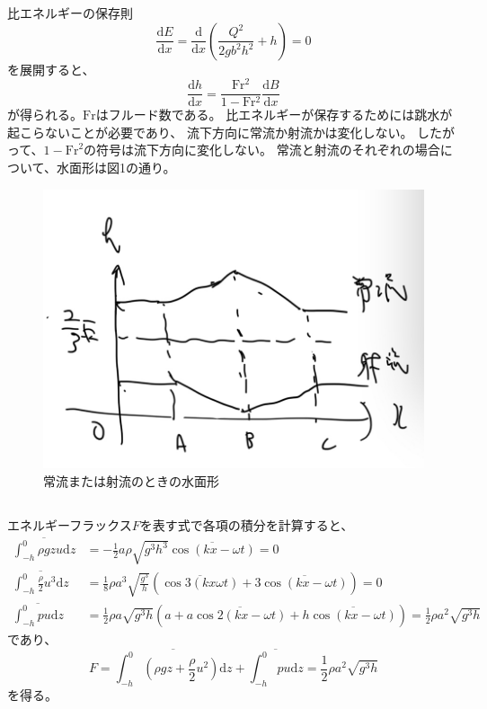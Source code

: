 \documentclass[a4paper]{jsarticle}
\begin{document}
\subsubsection{}
比エネルギーの保存則
\begin{equation}
  \frac{\mathrm{d} E}{\mathrm{d} x}
  = \frac{\mathrm{d}}{\mathrm{d} x}
  \left(\frac{Q^2}{2 g b^2 h^2} + h\right)
  = 0
\end{equation}
を展開すると、
\begin{equation}
  \frac{\mathrm{d} h}{\mathrm{d} x}
  = \frac{\mathrm{Fr^2}}{1 - \mathrm{Fr^2}}
  \frac{\mathrm{d} B}{\mathrm{d} x}
\end{equation}
が得られる。$\mathrm{Fr}$はフルード数である。
比エネルギーが保存するためには跳水が起こらないことが必要であり、
流下方向に常流か射流かは変化しない。
したがって、$1 - \mathrm{Fr}^2$の符号は流下方向に変化しない。
常流と射流のそれぞれの場合について、水面形は図1の通り。
\begin{figure}[htb]
  \centering
  \includegraphics[width=0.5\hsize]{fig1.png}
  \caption{常流または射流のときの水面形}
\end{figure}

\subsection{}
\subsubsection{}
エネルギーフラックス$F$を表す式で各項の積分を計算すると、
\begin{align}
  \overline{\int_{-h}^0 \rho g z u \mathrm{d} z}
  &= -\frac{1}{2} a \rho \sqrt{g^3 h^3} \overline{\cos (kx - \omega t)}
  = 0 \\
  \overline{\int_{-h}^0 \frac{\rho}{2} u^3 \mathrm{d} z}
  &= \frac{1}{8} \rho a^3 \sqrt{\frac{g^3}{h}}
  (\overline{\cos 3(k x \omega t)} + 3 \overline{\cos (k x - \omega t)}) = 0 \\
  \overline{\int_{-h}^0 p u \mathrm{d} z}
  &= \frac{1}{2} \rho a \sqrt{g^3 h} (a + a \overline{\cos 2(k x - \omega t)} + h \overline{\cos (k x - \omega t)})
  = \frac{1}{2} \rho a^2 \sqrt{g^3 h}
\end{align}
であり、
\begin{equation}
  F = \overline{\int_{-h}^0 \left(\rho g z + \frac{\rho}{2} u^2\right) \mathrm{d} z}
  + \overline{\int_{-h}^0 p u \mathrm{d} z}
  = \frac{1}{2} \rho a^2 \sqrt{g^3 h}
\end{equation}
を得る。
\end{document}
